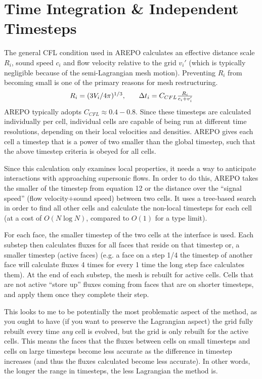 \documentclass[12pt, preprint]{aastex}
\begin{document}
\section{Time Integration \& Independent Timesteps}
The general CFL condition used in AREPO calculates an effective distance scale
$R_i$, sound speed $c_i$ and flow velocity relative to the grid $v_i'$ (which is
typically negligible because of the semi-Lagrangian mesh motion).  Preventing
$R_i$ from becoming small is one of the primary reasons for mesh restructuring.
\begin{equation}
	\begin{array}{l l l}
		R_i = (3V_i/4\pi)^{1/3}, & &
	\Delta t_i = C_{CFL}\frac{R_i}{c_i+v_i'}\\
\end{array}
\end{equation}
AREPO typically adopts $C_{CFL} \approx 0.4-0.8$.  Since these timesteps are
calculated individually per cell, individual cells are capable of being run at
different time resolutions, depending on their local velocities and densities.
AREPO gives each cell a timestep that is a power of two smaller than the global
timestep, such that the above timestep criteria is obeyed for all cells.

Since this calculation only examines local properties, it needs a way to
anticipate interactions with approaching supersonic flows. In order to do this,
AREPO takes the smaller of the timestep from equation 12 or the distance over
the ``signal speed'' (flow velocity+sound speed) between two cells.  It uses a
tree-based search in order to find all other cells and calculate the non-local
timesteps for each cell (at a cost of $O(N\log N)$, compared to $O(1)$ for a
\citet{saitoh2009} type limit).

For each face, the smaller timestep of the two cells at the interface is used.
Each substep then calculates fluxes for all faces that reside on that timestep
or, a smaller timestep (active faces) (e.g. a face on a step 1/4 the timestep of
another face will calculate fluxes 4 times for every 1 time the long step face
calculates them).  At the end of each substep, the mesh is rebuilt for active
cells.  Cells that are not active ``store up'' fluxes coming from faces that are
on shorter timesteps, and apply them once they complete their step.


This looks to me to be potentially the most problematic aspect of the method, as
you ought to have (if you want to preserve the Lagrangian aspect) the grid fully
rebuilt every time \textit{any} cell is evolved, but the grid is only rebuilt
for the active cells.  This means the faces that the fluxes between cells on
small timesteps and cells on large timesteps become less accurate as the
difference in timestep increases (and thus the fluxes calculated become less
accurate). In other words, the longer the range in timesteps, the less
Lagrangian the method is.
\end{document}
